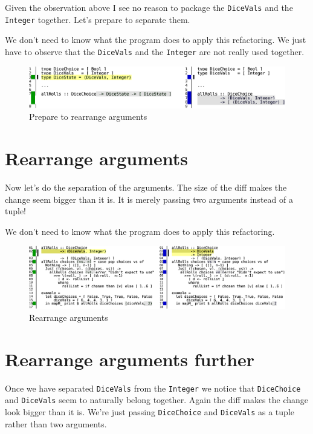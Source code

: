 Given the observation above I see no reason to package the \texttt{DiceVals} and the \texttt{Integer} together. Let's prepare to separate them.

We don't need to know what the program does to apply this refactoring. We just have to observe that the \texttt{DiceVals} and the \texttt{Integer} are not really used together.

\begin{figure}[htbp]
 \centering
 \includegraphics[width=\linewidth]{./pics/diff6.pdf}
 \caption{Prepare to rearrange arguments}
 \label{fig:diff6}
\end{figure}

\section{Rearrange arguments}


Now let's do the separation of the arguments. The size of the diff makes the change seem bigger than it is. It is merely passing two arguments instead of a tuple!

We don't need to know what the program does to apply this refactoring.

\begin{figure}[htbp]
 \centering
 \includegraphics[width=\linewidth]{./pics/diff5.pdf}
 \caption{Rearrange arguments}
 \label{fig:diff5}
\end{figure}

\section{Rearrange arguments further}

Once we have separated \texttt{DiceVals} from the \texttt{Integer} we notice that \texttt{DiceChoice} and \texttt{DiceVals} seem to naturally belong together. Again the diff makes the change look bigger than it is. We're just passing \texttt{DiceChoice} and \texttt{DiceVals} as a tuple rather than two arguments.

